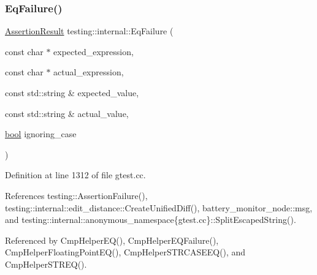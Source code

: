 \subsubsection{\texorpdfstring{Eq\+Failure()}{EqFailure()}}
{\footnotesize\ttfamily \hyperlink{classtesting_1_1AssertionResult}{Assertion\+Result} testing\+::internal\+::\+Eq\+Failure (\begin{DoxyParamCaption}\item[{const char $\ast$}]{expected\+\_\+expression,  }\item[{const char $\ast$}]{actual\+\_\+expression,  }\item[{const std\+::string \&}]{expected\+\_\+value,  }\item[{const std\+::string \&}]{actual\+\_\+value,  }\item[{\hyperlink{classbool}{bool}}]{ignoring\+\_\+case }\end{DoxyParamCaption})}



Definition at line 1312 of file gtest.\+cc.



References testing\+::\+Assertion\+Failure(), testing\+::internal\+::edit\+\_\+distance\+::\+Create\+Unified\+Diff(), battery\+\_\+monitor\+\_\+node\+::msg, and testing\+::internal\+::anonymous\+\_\+namespace\{gtest.\+cc\}\+::\+Split\+Escaped\+String().



Referenced by Cmp\+Helper\+E\+Q(), Cmp\+Helper\+E\+Q\+Failure(), Cmp\+Helper\+Floating\+Point\+E\+Q(), Cmp\+Helper\+S\+T\+R\+C\+A\+S\+E\+E\+Q(), and Cmp\+Helper\+S\+T\+R\+E\+Q().


